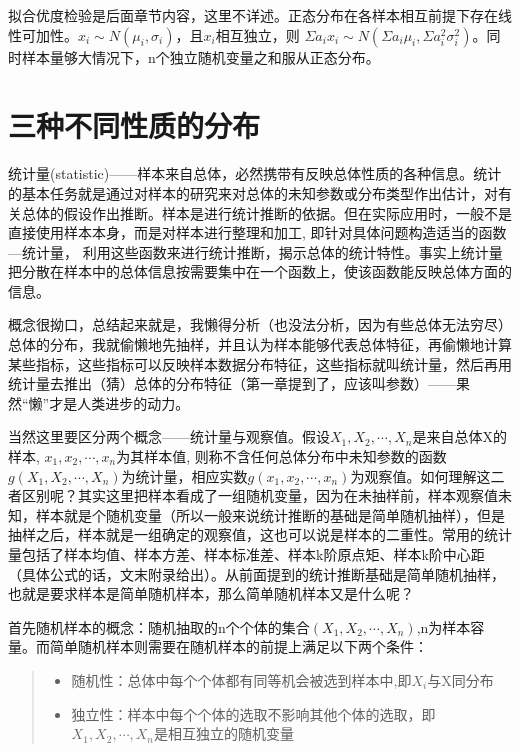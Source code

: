 \documentclass[]{ctexbook}
\providecommand{\tightlist}{%
  \setlength{\itemsep}{0pt}\setlength{\parskip}{0pt}}
\begin{document}
拟合优度检验是后面章节内容，这里不详述。正态分布在各样本相互前提下存在线性可加性。\(x_i\sim N(\mu_i,\sigma_i)\)，且\(x_i\)相互独立，则
\(\Sigma a_ix_i\sim N(\Sigma a_i\mu_i,\Sigma a_i^2\sigma_i^2)\)。同时样本量够大情况下，n个独立随机变量之和服从正态分布。

\hypertarget{ux4e09ux79cdux4e0dux540cux6027ux8d28ux7684ux5206ux5e03}{%
\section{三种不同性质的分布}\label{ux4e09ux79cdux4e0dux540cux6027ux8d28ux7684ux5206ux5e03}}

统计量(statistic)------样本来自总体，必然携带有反映总体性质的各种信息。统计的基本任务就是通过对样本的研究来对总体的未知参数或分布类型作出估计，对有关总体的假设作出推断。样本是进行统计推断的依据。但在实际应用时，一般不是直接使用样本本身，而是对样本进行整理和加工, 即针对具体问题构造适当的函数---统计量， 利用这些函数来进行统计推断，揭示总体的统计特性。事实上统计量把分散在样本中的总体信息按需要集中在一个函数上，使该函数能反映总体方面的信息。

概念很拗口，总结起来就是，我懒得分析（也没法分析，因为有些总体无法穷尽）总体的分布，我就偷懒地先抽样，并且认为样本能够代表总体特征，再偷懒地计算某些指标，这些指标可以反映样本数据分布特征，这些指标就叫统计量，然后再用统计量去推出（猜）总体的分布特征（第一章提到了，应该叫参数）------果然``懒''才是人类进步的动力。

当然这里要区分两个概念------统计量与观察值。假设\(X_1,X_2, \cdots ,X_n\)是来自总体X的样本, \(x_1,x_2,\cdots ,x_n\)为其样本值, 则称不含任何总体分布中未知参数的函数\(g(X_1,X_2,\cdots,X_n)\)为统计量，相应实数\(g(x_1,x_2,\cdots,x_n)\)为观察值。如何理解这二者区别呢？其实这里把样本看成了一组随机变量，因为在未抽样前，样本观察值未知，样本就是个随机变量（所以一般来说统计推断的基础是简单随机抽样），但是抽样之后，样本就是一组确定的观察值，这也可以说是样本的二重性。常用的统计量包括了样本均值、样本方差、样本标准差、样本k阶原点矩、样本k阶中心距（具体公式的话，文末附录给出）。从前面提到的统计推断基础是简单随机抽样，也就是要求样本是简单随机样本，那么简单随机样本又是什么呢？

首先随机样本的概念：随机抽取的n个个体的集合\((X_1,X_2, \cdots ,X_n)\),n为样本容量。而简单随机样本则需要在随机样本的前提上满足以下两个条件：

\begin{quote}
\begin{itemize}
\tightlist
\item
  随机性：总体中每个个体都有同等机会被选到样本中,即\(X_i\)与X同分布
\item
  独立性：样本中每个个体的选取不影响其他个体的选取，即\(X_1,X_2, \cdots ,X_n\)是相互独立的随机变量
\end{itemize}
\end{quote}
\end{document}
